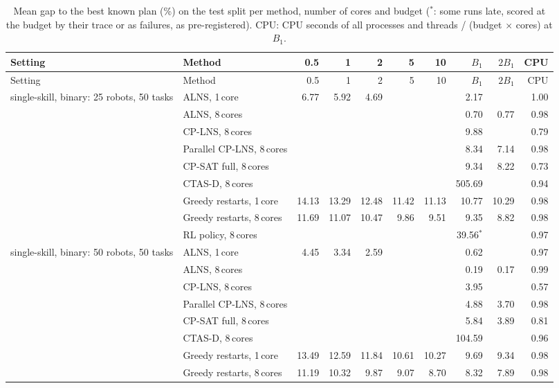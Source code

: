 \begin{longtable}{llrrrrrrrr}
\caption{Mean gap to the best known plan (\%) on the test split per method, number of cores and budget ($^*$: some runs late, scored at the budget by their trace or as failures, as pre-registered). CPU: CPU seconds of all processes and threads / (budget $\times$ cores) at $B_1$.}\label{tab:supp-gaps}\\
\toprule
Setting & Method & 0.5 & 1 & 2 & 5 & 10 & $B_1$ & $2B_1$ & CPU \\
\midrule
\endfirsthead
\toprule
Setting & Method & 0.5 & 1 & 2 & 5 & 10 & $B_1$ & $2B_1$ & CPU \\
\midrule
\endhead
single-skill, binary: 25 robots, 50 tasks & ALNS, 1\,core & 6.77 & 5.92 & 4.69 &  &  & 2.17 &  & 1.00 \\
 & ALNS, 8\,cores &  &  &  &  &  & 0.70 & 0.77 & 0.98 \\
 & CP-LNS, 8\,cores &  &  &  &  &  & 9.88 &  & 0.79 \\
 & Parallel CP-LNS, 8\,cores &  &  &  &  &  & 8.34 & 7.14 & 0.98 \\
 & CP-SAT full, 8\,cores &  &  &  &  &  & 9.34 & 8.22 & 0.73 \\
 & CTAS-D, 8\,cores &  &  &  &  &  & 505.69 &  & 0.94 \\
 & Greedy restarts, 1\,core & 14.13 & 13.29 & 12.48 & 11.42 & 11.13 & 10.77 & 10.29 & 0.98 \\
 & Greedy restarts, 8\,cores & 11.69 & 11.07 & 10.47 & 9.86 & 9.51 & 9.35 & 8.82 & 0.98 \\
 & RL policy, 8\,cores &  &  &  &  &  & 39.56$^*$ &  & 0.97 \\
\midrule
single-skill, binary: 50 robots, 50 tasks & ALNS, 1\,core & 4.45 & 3.34 & 2.59 &  &  & 0.62 &  & 0.97 \\
 & ALNS, 8\,cores &  &  &  &  &  & 0.19 & 0.17 & 0.99 \\
 & CP-LNS, 8\,cores &  &  &  &  &  & 3.95 &  & 0.57 \\
 & Parallel CP-LNS, 8\,cores &  &  &  &  &  & 4.88 & 3.70 & 0.98 \\
 & CP-SAT full, 8\,cores &  &  &  &  &  & 5.84 & 3.89 & 0.81 \\
 & CTAS-D, 8\,cores &  &  &  &  &  & 104.59 &  & 0.96 \\
 & Greedy restarts, 1\,core & 13.49 & 12.59 & 11.84 & 10.61 & 10.27 & 9.69 & 9.34 & 0.98 \\
 & Greedy restarts, 8\,cores & 11.19 & 10.32 & 9.87 & 9.07 & 8.70 & 8.32 & 7.89 & 0.98 \\

\end{longtable}
